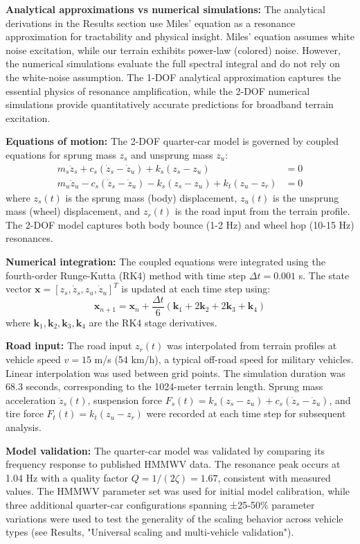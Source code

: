 \documentclass[11pt]{article}
\begin{document}
\textbf{Analytical approximations vs numerical simulations:} The analytical derivations in the Results section use Miles' equation as a resonance approximation for tractability and physical insight. Miles' equation assumes white noise excitation, while our terrain exhibits power-law (colored) noise. However, the numerical simulations evaluate the full spectral integral and do not rely on the white-noise assumption. The 1-DOF analytical approximation captures the essential physics of resonance amplification, while the 2-DOF numerical simulations provide quantitatively accurate predictions for broadband terrain excitation.

\textbf{Equations of motion:} The 2-DOF quarter-car model is governed by coupled equations for sprung mass $z_s$ and unsprung mass $z_u$:
\begin{align}
m_s \ddot{z}_s + c_s (\dot{z}_s - \dot{z}_u) + k_s (z_s - z_u) &= 0 \\
m_u \ddot{z}_u - c_s (\dot{z}_s - \dot{z}_u) - k_s (z_s - z_u) + k_t (z_u - z_r) &= 0
\end{align}
where $z_s(t)$ is the sprung mass (body) displacement, $z_u(t)$ is the unsprung mass (wheel) displacement, and $z_r(t)$ is the road input from the terrain profile. The 2-DOF model captures both body bounce (1-2 Hz) and wheel hop (10-15 Hz) resonances.

\textbf{Numerical integration:} The coupled equations were integrated using the fourth-order Runge-Kutta (RK4) method with time step $\Delta t = 0.001$ s. The state vector $\mathbf{x} = [z_s, \dot{z}_s, z_u, \dot{z}_u]^T$ is updated at each time step using:
\begin{equation}
\mathbf{x}_{n+1} = \mathbf{x}_n + \frac{\Delta t}{6}(\mathbf{k}_1 + 2\mathbf{k}_2 + 2\mathbf{k}_3 + \mathbf{k}_4)
\end{equation}
where $\mathbf{k}_1, \mathbf{k}_2, \mathbf{k}_3, \mathbf{k}_4$ are the RK4 stage derivatives.

\textbf{Road input:} The road input $z_r(t)$ was interpolated from terrain profiles at vehicle speed $v = 15$ m/s (54 km/h), a typical off-road speed for military vehicles. Linear interpolation was used between grid points. The simulation duration was 68.3 seconds, corresponding to the 1024-meter terrain length. Sprung mass acceleration $\ddot{z}_s(t)$, suspension force $F_s(t) = k_s(z_s - z_u) + c_s(\dot{z}_s - \dot{z}_u)$, and tire force $F_t(t) = k_t(z_u - z_r)$ were recorded at each time step for subsequent analysis.

\textbf{Model validation:} The quarter-car model was validated by comparing its frequency response to published HMMWV data. The resonance peak occurs at 1.04 Hz with a quality factor $Q = 1/(2\zeta) = 1.67$, consistent with measured values. The HMMWV parameter set was used for initial model calibration, while three additional quarter-car configurations spanning ±25-50\% parameter variations were used to test the generality of the scaling behavior across vehicle types (see Results, "Universal scaling and multi-vehicle validation").
\end{document}
